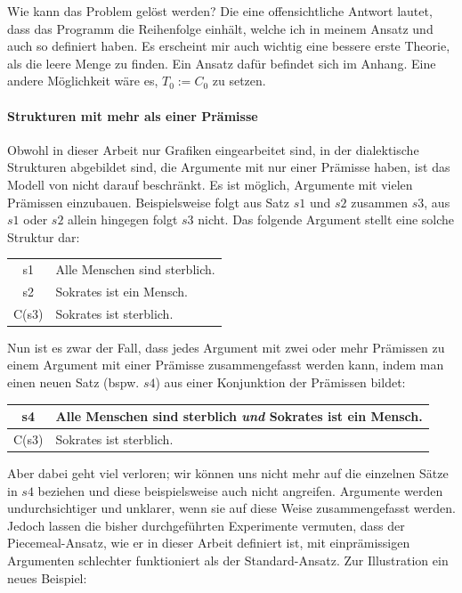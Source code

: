 \documentclass{article}
\begin{document}
Wie kann das Problem gelöst werden? Die eine offensichtliche Antwort lautet, dass das Programm die Reihenfolge einhält, welche ich in meinem Ansatz und auch \cite[S.~466]{beisbart_making_2021} so definiert haben. Es erscheint mir auch wichtig eine bessere erste Theorie, als die leere Menge zu finden. Ein Ansatz dafür befindet sich im Anhang. Eine andere Möglichkeit wäre es, $T_0 := C_0$ zu setzen.

\paragraph{Strukturen mit mehr als einer Prämisse} \label{mehrAlsEineP}
Obwohl in dieser Arbeit nur Grafiken eingearbeitet sind, in der dialektische Strukturen abgebildet sind, die Argumente mit nur einer Prämisse haben, ist das Modell von \citeauthor{beisbart_making_2021} nicht darauf beschränkt. Es ist möglich, Argumente mit vielen Prämissen einzubauen. Beispielsweise folgt aus Satz $s1$ und $s2$ zusammen $s3$, aus $s1$ oder $s2$ allein hingegen folgt $s3$ nicht. Das folgende Argument stellt eine solche Struktur dar:

\begin{center}
\begin{tabular}{c p{9cm}}
s1 & Alle Menschen sind sterblich.\\
s2 & Sokrates ist ein Mensch.\\\hline
C(s3) & Sokrates ist sterblich. 
\end{tabular}
\end{center}

Nun ist es zwar der Fall, dass jedes Argument mit zwei oder mehr Prämissen zu einem Argument mit einer Prämisse zusammengefasst werden kann, indem man einen neuen Satz (bspw. $s4$) aus einer Konjunktion der Prämissen bildet:

\begin{center}
\begin{tabular}{c p{9cm}}
s4 & Alle Menschen sind sterblich \textit{und} Sokrates ist ein Mensch.\\\hline
C(s3) & Sokrates ist sterblich. 
\end{tabular}
\end{center}

Aber dabei geht viel verloren; wir können uns nicht mehr auf die einzelnen Sätze in $s4$ beziehen und diese beispielsweise auch nicht angreifen. Argumente werden undurchsichtiger und unklarer, wenn sie auf diese Weise zusammengefasst werden.
Jedoch lassen die bisher durchgeführten Experimente vermuten, dass der Piecemeal-Ansatz, wie er in dieser Arbeit definiert ist, mit einprämissigen Argumenten schlechter funktioniert als der Standard-Ansatz. Zur Illustration ein neues Beispiel:
\end{document}
